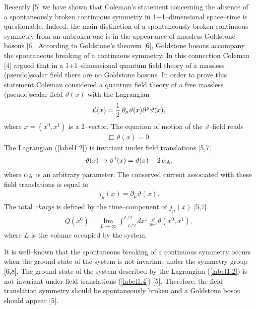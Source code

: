 \documentclass[a4paper,12pt] {article}
\begin{document}
Recently [5] we have shown that Coleman's statement concerning the
absence of a spontaneously broken continuous symmetry in
1+1--dimensional space--time is questionable. Indeed, the main
distinction of a spontaneously broken continuous symmetry from an
unbroken one is in the appearance of massless Goldstone bosons [6].
According to Goldstone's theorem [6], Goldstone bosons accompany the
spontaneous breaking of a continuous symmetry. In this connection
Coleman [4] argued that in a 1+1--dimensional quantum field theory of
a massless (pseudo)scalar field there are no Goldstone bosons.  In
order to prove this statement Coleman considered a quantum field
theory of a free massless (pseudo)scalar field $\vartheta(x)$ with the
Lagrangian
%
\begin{eqnarray}\label{label1.2}
{\cal L}(x) =
\frac{1}{2}\,\partial_{\mu}\vartheta(x)\partial^{\mu}\vartheta(x),
\end{eqnarray}
%
where $x = (x^0,x^1)$ is a 2--vector. The equation of motion of the
$\vartheta$--field reads
%
\begin{eqnarray}\label{label1.3}
\Box \vartheta(x) = 0.
\end{eqnarray}
%
The Lagrangian (\ref{label1.2}) is invariant under field
translations [5,7] 
%
\begin{eqnarray}\label{label1.4}
 \vartheta(x) \to \vartheta\,'(x) = \vartheta(x) - 2\,\alpha_{\rm A},
\end{eqnarray}
%
where $\alpha_{\rm A}$ is an arbitrary parameter. The conserved
current associated with these field translations is equal to
%
\begin{eqnarray}\label{label1.5}
j_{\mu}(x) = \partial_{\mu}\vartheta(x).
\end{eqnarray}
%
The total {\it charge} is defined by the time--component of
$j_{\mu}(x)$  [5,7]
%
\begin{eqnarray}\label{label1.6}
Q(x^0) =\lim_{L\to \infty} \int^{ L/2}_{-
L/2}dx^1\,\frac{\partial}{\partial x^0}\vartheta(x^0,x^1),
\end{eqnarray}
%
where $L$ is the volume occupied by the system.

It is well--known that the spontaneous breaking of a continuous
symmetry occurs when the ground state of the system is not invariant
under the symmetry group [6,8]. The ground state of the system described
by the Lagrangian (\ref{label1.2}) is not invariant under field
translations (\ref{label1.4}) [5]. Therefore, the field--translation
symmetry should be spontaneously broken and a Goldstone boson should
appear [5].
\end{document}
